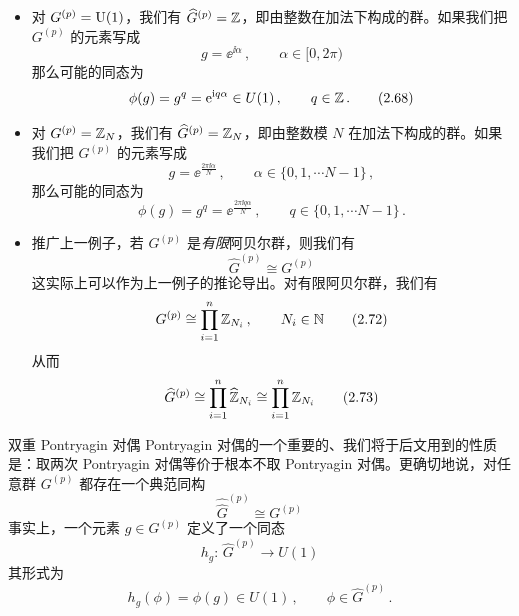 \begin{itemize}[leftmargin=1.4em,itemsep=1pt,topsep=1pt]
\item 对 $G^{(p)}=\mathrm{U}(1)$，我们有 $\widehat{G}^{(p)}=\mathbb{Z}$，即由整数在加法下构成的群。如果我们把 $G^{(p)}$ 的元素写成
\begin{equation}
  g = \ee^{\ii\alpha}\,,\qquad \alpha\in[0,2\pi) \tag{2.67}
\end{equation}
那么可能的同态为
\begin{equation}
  \phi(g) = g^q = \mathrm{e}^{\mathrm{i} q\alpha}\in U(1)\,,\qquad q\in\mathbb{Z}\,. \tag{2.68}
\end{equation}
\item 对 $G^{(p)}=\mathbb{Z}_N$，我们有 $\widehat{G}^{(p)}=\mathbb{Z}_N$，即由整数模 $N$ 在加法下构成的群。如果我们把 $G^{(p)}$ 的元素写成
\begin{equation}
  g = \ee^{\frac{2\pi\ii\alpha}{N}}\,,\qquad \alpha\in\{0,1,\cdots N-1\}\,, \tag{2.69}
\end{equation}
那么可能的同态为
\begin{equation}
  \phi(g) = g^q = \ee^{\frac{2\pi\ii q\alpha}{N}}\,,\qquad q\in\{0,1,\cdots N-1\}\,. \tag{2.70}
\end{equation}
\item 推广上一例子，若 $G^{(p)}$ 是\emph{有限}阿贝尔群，则我们有
\begin{equation}
  \widehat{G}^{(p)}\cong G^{(p)} \tag{2.71}
\end{equation}
这实际上可以作为上一例子的推论导出。对有限阿贝尔群，我们有
\begin{equation}
  G^{(p)}\cong\prod_{i=1}^{n}\mathbb{Z}_{N_i}\,,\qquad N_i\in\mathbb{N} \tag{2.72}
\end{equation}
从而
\begin{equation}
  \widehat{G}^{(p)}\cong\prod_{i=1}^{n}\widehat{\mathbb{Z}}_{N_i}\cong\prod_{i=1}^{n}\mathbb{Z}_{N_i} \tag{2.73}
\end{equation}
\end{itemize}


\begin{notebox}{双重 Pontryagin 对偶}
Pontryagin 对偶的一个重要的、我们将于后文用到的性质是：取两次 Pontryagin 对偶等价于根本不取 Pontryagin 对偶。更确切地说，对任意群 $G^{(p)}$ 都存在一个典范同构
\begin{equation}
  \widehat{\widehat{G}}^{(p)}\cong G^{(p)} \tag{2.74}
\end{equation}
事实上，一个元素 $g\in G^{(p)}$ 定义了一个同态
\begin{equation}
  h_g:\,\widehat{G}^{(p)}\to U(1) \tag{2.75}
\end{equation}
其形式为
\begin{equation}
  h_g(\phi) = \phi(g)\in U(1)\,,\qquad \phi\in\widehat{G}^{(p)}\,. \tag{2.76}
\end{equation}
\end{notebox}

